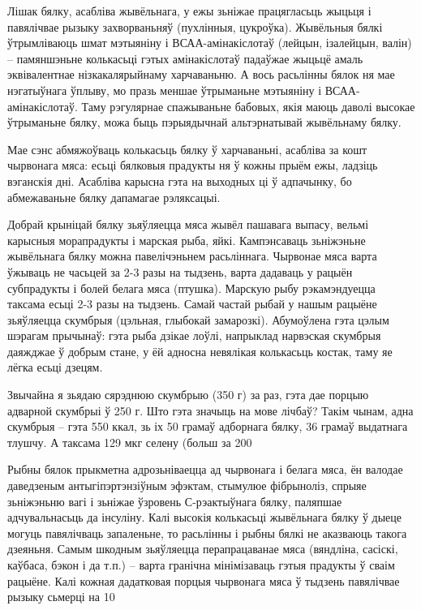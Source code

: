 Лішак бялку, асабліва жывёльнага, у ежы зьніжае працягласьць жыцьця і павялічвае рызыку захворваньняў (пухлінныя, цукроўка). Жывёльныя бялкі ўтрымліваюць шмат мэтыяніну і ВСАА-амінакіслотаў (лейцын, ізалейцын, валін) – памяншэньне колькасьці гэтых амінакіслотаў падаўжае жыцьцё амаль эквівалентнае нізкакалярыйнаму харчаваньню. А вось расьлінны бялок ня мае нэгатыўнага ўплыву, мо празь меншае ўтрыманьне мэтыяніну і ВСАА-амінакіслотаў. Таму рэгулярнае спажываньне бабовых, якія маюць даволі высокае ўтрыманьне бялку, можа быць пэрыядычнай альтэрнатывай жывёльнаму бялку.

Мае сэнс абмяжоўваць колькасьць бялку ў харчаваньні, асабліва за кошт чырвонага мяса: есьці бялковыя прадукты ня ў кожны прыём ежы, ладзіць вэганскія дні. Асабліва карысна гэта на выходных ці ў адпачынку, бо абмежаваньне бялку дапамагае рэляксацыі.

Добрай крыніцай бялку зьяўляецца мяса жывёл пашавага выпасу, вельмі карысныя морапрадукты і марская рыба, яйкі. Кампэнсаваць зьніжэньне жывёльнага бялку можна павелічэньнем расьліннага. Чырвонае мяса варта ўжываць не часьцей за 2-3 разы на тыдзень, варта дадаваць у рацыён субпрадукты і болей белага мяса (птушка). Марскую рыбу рэкамэндуецца таксама есьці 2-3 разы на тыдзень. Самай частай рыбай у нашым рацыёне зьяўляецца скумбрыя (цэльная, глыбокай замарозкі). Абумоўлена гэта цэлым шэрагам прычынаў: гэта рыба дзікае лоўлі, напрыклад нарвэская скумбрыя даяжджае ў добрым стане, у ёй адносна невялікая колькасьць костак, таму яе лёгка есьці дзецям.

Звычайна я зьядаю сярэднюю скумбрыю (350 г) за раз, гэта дае порцыю адварной скумбрыі ў 250 г. Што гэта значыць на мове лічбаў? Такім чынам, адна скумбрыя – гэта 550 ккал, зь іх 50 грамаў адборнага бялку, 36 грамаў выдатнага тлушчу. А таксама 129 мкг селену (больш за 200%

Рыбны бялок прыкметна адрозьніваецца ад чырвонага і белага мяса, ён валодае даведзеным антыгіпэртэнзіўным эфэктам, стымулюе фібрыноліз, спрыяе зьніжэньню вагі і зьніжае ўзровень С-рэактыўнага бялку, паляпшае адчувальнасьць да інсуліну. Калі высокія колькасьці жывёльнага бялку ў дыеце могуць павялічваць запаленьне, то расьлінны і рыбны бялкі не аказваюць такога дзеяньня. Самым шкодным зьяўляецца перапрацаванае мяса (вяндліна, сасіскі, каўбаса, бэкон і да т.п.) – варта гранічна мінімізаваць гэтыя прадукты ў сваім рацыёне. Калі кожная дадатковая порцыя чырвонага мяса ў тыдзень павялічвае рызыку сьмерці на 10%

